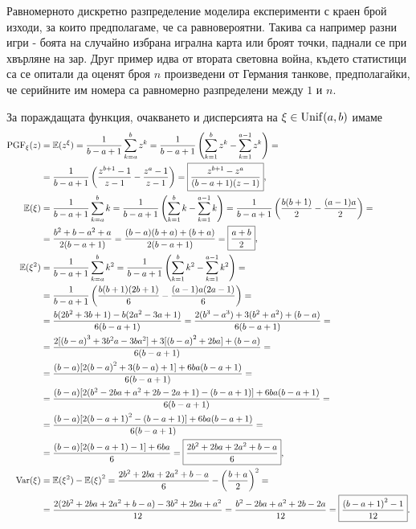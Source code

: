 \documentclass[numbers=endperiod, DIV=15, bibliography=totocnumbered]{scrartcl}
\begin{document}
Равномерното дискретно разпределение моделира експерименти с краен брой изходи, за които предполагаме, че са равновероятни. Такива са например разни игри - боята на случайно избрана игрална карта или броят точки, паднали се при хвърляне на зар. Друг пример идва от втората световна война, където статистици са се опитали да оценят броя $n$ произведени от Германия танкове, предполагайки, че серийните им номера са равномерно разпределени между $1$ и $n$.

За пораждащата функция, очакването и дисперсията на $\xi \in \operatorname{Unif}(a, b)$ имаме
\begingroup
\allowdisplaybreaks
\begin{align*}
  \operatorname{PGF}_\xi(z)
  &=
  \mathbb{E}(z^\xi)
  =
  \frac 1 {b-a+1} \sum_{k=a}^b z^k
  =
  \frac 1 {b-a+1} \left( \sum_{k=1}^b z^k - \sum_{k=1}^{a-1} z^k \right)
  = \\ &=
  \frac 1 {b-a+1} \left(\frac {z^{b+1} - 1} {z - 1} - \frac {z^a - 1} {z - 1} \right)
  =
  \boxed{\frac {z^{b+1} - z^a} {(b-a+1)(z-1)}},
  \\
  \mathbb{E}(\xi)
  &=
  \frac 1 {b-a+1} \sum_{k=a}^b k
  =
  \frac 1 {b-a+1} \left( \sum_{k=1}^b k - \sum_{k=1}^{a-1} k \right)
  =
  \frac 1 {b-a+1} \left( \frac {b(b+1)} 2 - \frac {(a-1)a} 2 \right)
  = \\ &=
  \frac {b^2 + b - a^2 + a} {2(b-a+1)}
  =
  \frac {(b-a)(b+a) + (b+a)} {2(b-a+1)}
  =
  \boxed{\frac {a+b} 2},
  \\
  \mathbb{E}(\xi^2)
  &=
  \frac 1 {b-a+1} \sum_{k=a}^b k^2
  =
  \frac 1 {b-a+1} \left( \sum_{k=1}^b k^2 - \sum_{k=1}^{a-1} k^2 \right)
  = \\ &=
  \frac 1 {b-a+1} \left( \frac {b(b+1)(2b+1)} 6 - \frac {(a-1)a(2a-1)} 6 \right)
  = \\ &=
  \frac {b(2b^2 + 3b + 1) - b(2a^2 - 3a + 1)} {6(b-a+1)}
  =
  \frac {2(b^3 - a^3) + 3(b^2 + a^2) + (b-a)} {6(b-a+1)}
  = \\ &=
  \frac {2[{(b-a)}^3 + 3b^2a - 3ba^2] + 3[{(b-a)}^2 + 2ba] + (b-a)} {6(b-a+1)}
  = \\ &=
  \frac {(b-a) [2{(b-a)}^2 + 3(b-a) + 1] + 6ba(b-a+1)} {6(b-a+1)}
  = \\ &=
  \frac {(b-a) [2(b^2 - 2ba + a^2 + 2b - 2a + 1) - (b-a+1)] + 6ba(b-a+1)} {6(b-a+1)}
  = \\ &=
  \frac {(b-a) [2{(b-a+1)}^2 - (b-a+1)] + 6ba(b-a+1)} {6(b-a+1)}
  = \\ &=
  \frac {(b-a) [2(b-a+1)-1] + 6ba} 6
  =
  \boxed{\frac {2b^2+2ba+2a^2+b-a} 6},
  \\
  \operatorname{Var}(\xi)
  &=
  \mathbb{E}(\xi^2) - {\mathbb{E}(\xi)}^2
  =
  \frac {2b^2+2ba+2a^2+b-a} 6 - {\left( \frac {b+a} 2 \right)}^2
  = \\ &=
  \frac {2(2b^2+2ba+2a^2+b-a) - 3{b^2+2ba+a^2}} {12}
  =
  \frac {b^2-2ba+a^2+2b-2a} {12}
  =
  \boxed{\frac {{(b-a+1)}^2-1} {12}}.
\end{align*}
\endgroup
\end{document}
